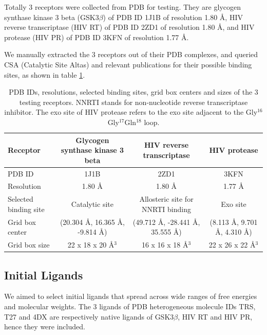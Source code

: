 \documentclass[10pt, conference, compsocconf]{IEEEtran}
\begin{document}
Totally 3 receptors were collected from PDB \cite{96} for testing. They are glycogen synthase kinase 3 beta (GSK3$\beta$) of PDB ID 1J1B \cite{245} of resolution 1.80 \AA, HIV reverse transcriptase (HIV RT) of PDB ID 2ZD1 \cite{180} of resolution 1.80 \AA, and HIV protease (HIV PR) of PDB ID 3KFN \cite{243} of resolution 1.77 \AA.

We manually extracted the 3 receptors out of their PDB complexes, and queried CSA (Catalytic Site Altas) \cite{206} and relevant publications \cite{245,246,180,221,222,223,243} for their possible binding sites, as shown in table \ref{tab:searchspace}.

\begin{table}
\centering
\begin{tabular*}
{\linewidth}
{@{\extracolsep{\fill}}lccc}
\noalign{\smallskip}
\toprule
Receptor & Glycogen synthase kinase 3 beta & HIV reverse transcriptase & HIV protease\\
\midrule
\noalign{\smallskip}
PDB ID & 1J1B & 2ZD1 & 3KFN\\
Resolution & 1.80 \AA & 1.80 \AA & 1.77 \AA\\
Selected binding site & Catalytic site & Allosteric site for NNRTI binding & Exo site\\
Grid box center & (20.304 \AA, 16.365 \AA, -9.814 \AA) & (49.712 \AA, -28.441 \AA, 35.555 \AA) & (8.113 \AA, 9.701 \AA, 4.310 \AA) \\
Grid box size & 22 x 18 x 20 \AA$^3$ & 16 x 16 x 18 \AA$^3$ & 22 x 26 x 22 \AA$^3$\\
\bottomrule
\end{tabular*}
\caption{PDB IDs, resolutions, selected binding sites, grid box centers and sizes of the 3 testing receptors. NNRTI stands for non-nucleotide reverse transcriptase inhibitor. The exo site of HIV protease refers to the exo site adjacent to the Gly$^{16}$Gly$^{17}$Gln$^{18}$ loop.}
\label{tab:searchspace}
\end{table}

\subsection{Initial Ligands}

We aimed to select initial ligands that spread across wide ranges of free energies and molecular weights. The 3 ligands of PDB heterogeneous molecule IDs TRS, T27 and 4DX are respectively native ligands of GSK3$\beta$, HIV RT and HIV PR, hence they were included.
\end{document}
